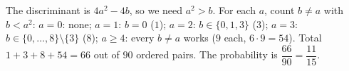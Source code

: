 The discriminant is $4a^2-4b$, so we need $a^2>b$. For each $a$, count $b\ne a$ with $b<a^2$: $a=0$: none; $a=1$: $b=0$ ($1$); $a=2$: $b\in\{0,1,3\}$ ($3$); $a=3$: $b\in\{0,\dots,8\}\setminus\{3\}$ ($8$); $a\ge4$: every $b\ne a$ works ($9$ each, $6\cdot9=54$). Total $1+3+8+54=66$ out of $90$ ordered pairs. The probability is $\dfrac{66}{90}=\boxed{\dfrac{11}{15}}$.
